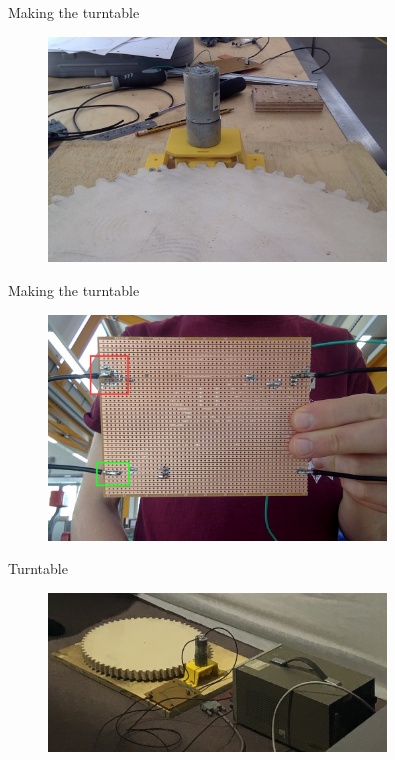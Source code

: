 \documentclass{beamer}
\begin{document}
\begin{frame}{Making the turntable}
    \begin{figure}[H]
      \centering
        \includegraphics[width=0.8\textwidth]{mounted_motor.jpg}
      \label{fig:f2}
    \end{figure}
\end{frame}

\begin{frame}{Making the turntable}
    \begin{figure}[H]
      \centering
        \includegraphics[width=0.8\textwidth]{circuit_1_red.jpg}
      \label{fig:f2}
    \end{figure}
\end{frame}

\begin{frame}{Turntable}
    \begin{figure}[H]
      \centering
        \includegraphics[width=0.8\textwidth]{assembly.jpg}
      \label{fig:f2}
    \end{figure}
\end{frame}
\end{document}
